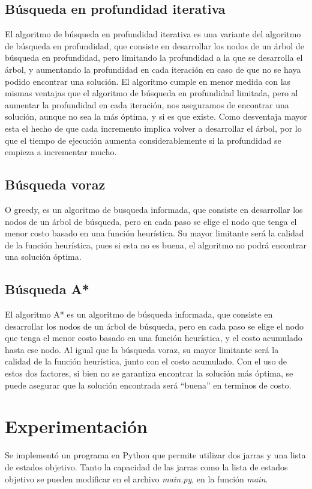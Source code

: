 \documentclass[journal]{IEEEtran}
\begin{document}
\subsection{Búsqueda en profundidad iterativa}
El algoritmo de búsqueda en profundidad iterativa es una variante del algoritmo de búsqueda en profundidad, que consiste en desarrollar los nodos de un árbol de búsqueda en profundidad, pero limitando la profundidad a la que se desarrolla el árbol, y aumentando la profundidad en cada iteración en caso de que no se haya podido encontrar una solución. El algoritmo cumple en menor medida con las mismas ventajas que el algoritmo de búsqueda en profundidad limitada, pero al aumentar la profundidad en cada iteración, nos aseguramos de encontrar una solución, aunque no sea la más óptima, y si es que existe. Como desventaja mayor esta el hecho de que cada incremento implica volver a desarrollar el árbol, por lo que el tiempo de ejecución aumenta considerablemente si la profundidad se empieza a incrementar mucho.

\subsection{Búsqueda voraz}
O greedy, es un algoritmo de busqueda informada, que consiste en desarrollar los nodos de un árbol de búsqueda, pero en cada paso se elige el nodo que tenga el menor costo basado en una función heurística. Su mayor limitante será la calidad de la función heurística, pues si esta no es buena, el algoritmo no podrá encontrar una solución óptima.

\subsection{Búsqueda A*}
El algoritmo A* es un algoritmo de búsqueda informada, que consiste en desarrollar los nodos de un árbol de búsqueda, pero en cada paso se elige el nodo que tenga el menor costo basado en una función heurística, y el costo acumulado hasta ese nodo. Al igual que la búsqueda voraz, su mayor limitante será la calidad de la función heurística, junto con el costo acumulado. Con el uso de estos dos factores, si bien no se garantiza encontrar la solución más óptima, se puede asegurar que la solución encontrada será ``buena'' en terminos de costo.

\section{Experimentación}
Se implementó un programa en Python que permite utilizar dos jarras y una lista de estados objetivo.
Tanto la capacidad de las jarras como la lista de estados objetivo se pueden modificar en el archivo \textit{main.py}, en la función \textit{main}.
\end{document}
